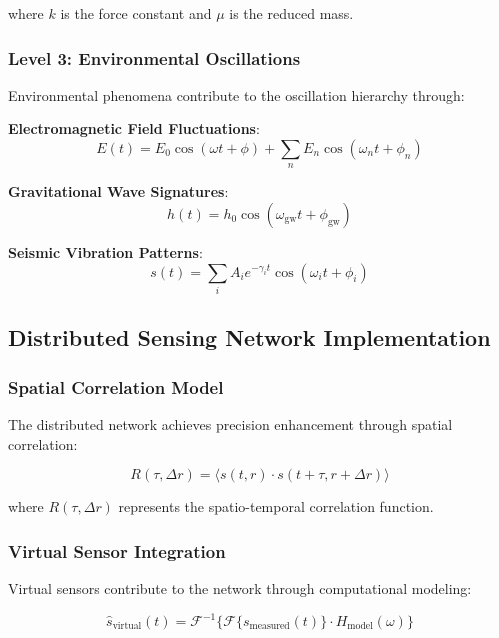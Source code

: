 \documentclass[12pt,a4paper]{article}
\begin{document}
{where $k$ is the force constant and $\mu$ is the reduced mass.

\subsubsection{Level 3: Environmental Oscillations}

Environmental phenomena contribute to the oscillation hierarchy through:

\textbf{Electromagnetic Field Fluctuations}:
\begin{equation}
E(t) = E_0 \cos(\omega t + \phi) + \sum_{n} E_n \cos(\omega_n t + \phi_n)
\end{equation}

\textbf{Gravitational Wave Signatures}:
\begin{equation}
h(t) = h_0 \cos(\omega_{\text{gw}} t + \phi_{\text{gw}})
\end{equation}

\textbf{Seismic Vibration Patterns}:
\begin{equation}
s(t) = \sum_{i} A_i e^{-\gamma_i t} \cos(\omega_i t + \phi_i)
\end{equation}

\subsection{Distributed Sensing Network Implementation}

\subsubsection{Spatial Correlation Model}

The distributed network achieves precision enhancement through spatial correlation:

\begin{equation}
R(\tau, \Delta r) = \langle s(t, r) \cdot s(t + \tau, r + \Delta r) \rangle
\end{equation}

where $R(\tau, \Delta r)$ represents the spatio-temporal correlation function.

\subsubsection{Virtual Sensor Integration}

Virtual sensors contribute to the network through computational modeling:

\begin{equation}
\hat{s}_{\text{virtual}}(t) = \mathcal{F}^{-1}\{\mathcal{F}\{s_{\text{measured}}(t)\} \cdot H_{\text{model}}(\omega)\}
\end{equation}

}
\end{document}
